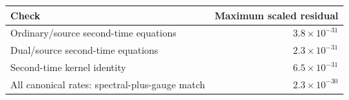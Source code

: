 \begin{center}
\begin{tabular}{lr}
\hline
Check & Maximum scaled residual\\
\hline
Ordinary/source second-time equations & $3.8\times10^{-31}$\\
Dual/source second-time equations & $2.3\times10^{-31}$\\
Second-time kernel identity & $6.5\times10^{-31}$\\
All canonical rates: spectral-plus-gauge match & $2.3\times10^{-30}$\\
\hline
\end{tabular}
\end{center}
